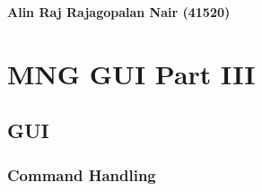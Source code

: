 \clearpage 
\null 
\vfill 
\begin{center}
\textbf{\large Alin Raj Rajagopalan Nair (41520)}
\end{center}
\vfill 
{}
\clearpage


\chapter{MNG GUI Part III}
\section{GUI} 

\subsection{Command Handling}
